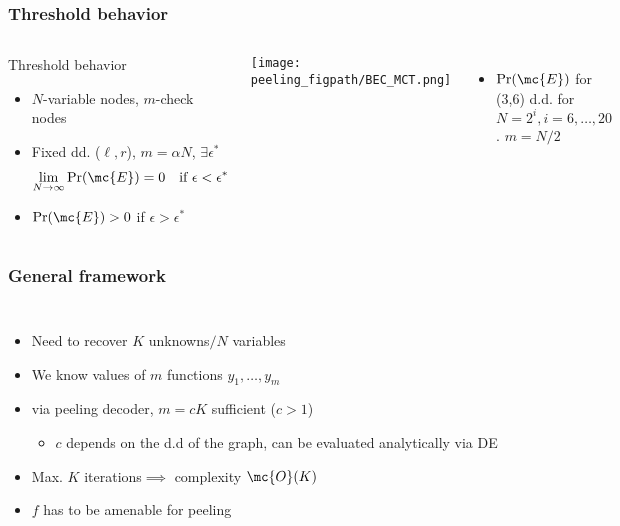 \begin{frame}\frametitle{Threshold behavior}
\begin{columns}
\begin{defn}{Threshold behavior}
\begin{itemize}
\item $N$-variable nodes, $m$-check nodes %
\item Fixed dd. ($\ell,r$), $m=\alpha N$, $\exists \epsilon^{*}$
\begin{align*}
\lim_{N\rightarrow \infty}\Pr(\mc{E})=0 ~~ \text{ if }\epsilon<\epsilon^*
\end{align*}
\item $\Pr(\mc{E})>0$ if $\epsilon>\epsilon^*$
\end{itemize}
\end{defn}

\texttt{[image: \\peeling\_figpath/BEC\_MCT.png]}
\begin{itemize}
\item $\Pr(\mc{E})$ for (3,6) d.d. for $N=2^i, i=6,\ldots,20$.  $m=N/2$
\end{itemize}

\end{columns}
\end{frame}

\begin{frame}\frametitle{General framework}
\begin{columns}
\resizebox{\textwidth}{!}{}

\begin{itemize}
\item Need to recover $K$ unknowns$/N$ variables
\item We know values of $m$ functions $y_1,\ldots,y_m$
\item via peeling decoder, $m=cK$ sufficient {\tiny ($c>1$)}
	\begin{itemize}
	\item $c$ depends on the d.d of the graph, can be evaluated analytically via DE
	\end{itemize}
\item Max. $K$ iterations$\implies$ complexity $\mc{O}(K)$
\pause
\vspace{5ex}
\item $f$ has to be {\color{blue} amenable for peeling}
\end{itemize}

\end{columns}
\end{frame}